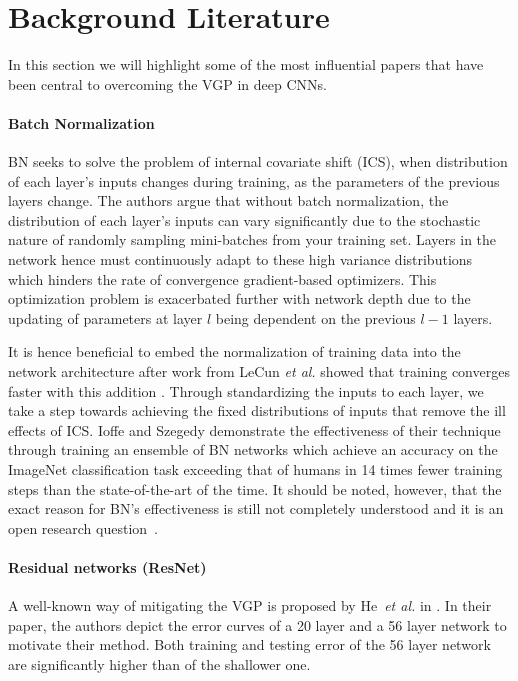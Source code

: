 \documentclass{article}
\begin{document}
\section{Background Literature}
\label{sec:lit_rev}
In this section we will highlight some of the most influential
papers that have been central to overcoming the VGP in
deep CNNs.

\paragraph{Batch Normalization}\cite{ioffe2015batch}
BN seeks to solve the  problem of 
internal covariate shift (ICS), when distribution of each layer’s 
inputs changes during training, as the parameters of the previous layers change. 
The authors
argue that without batch normalization, the distribution of
each layer’s inputs can vary significantly due to the 
stochastic nature of randomly sampling mini-batches from your
training set. Layers in the network hence must continuously
adapt to these high variance distributions which hinders the
rate of convergence gradient-based optimizers. This optimization
problem is exacerbated further with network depth due
to the updating of parameters at layer $l$ being dependent on
the previous $l-1$ layers.

It is hence beneficial to embed the normalization of
training data into the network architecture after work from
LeCun \emph{et al.} showed that training converges faster with
this addition \cite{lecun2012efficient}. Through standardizing
the inputs to each layer, we take a step towards achieving
the fixed distributions of inputs that remove the ill effects
of ICS. Ioffe and Szegedy demonstrate the effectiveness of
their technique through training an ensemble of BN
networks which achieve an accuracy on the ImageNet classification
task exceeding that of humans in 14 times fewer
training steps than the state-of-the-art of the time.
It should be noted, however, that the exact reason for
BN’s effectiveness is still not completely understood and it is 
an open research question~\cite{santurkar2018does}.



\paragraph{Residual networks (ResNet)}\cite{he2016deep} A well-known way of mitigating the VGP is proposed by He~\emph{et al.} in \cite{he2016deep}. In their paper, the authors depict the error curves of a 20 layer and a 56 layer network to motivate their method. Both training and testing error of the 56 layer network are significantly higher than of the shallower one.
\end{document}
